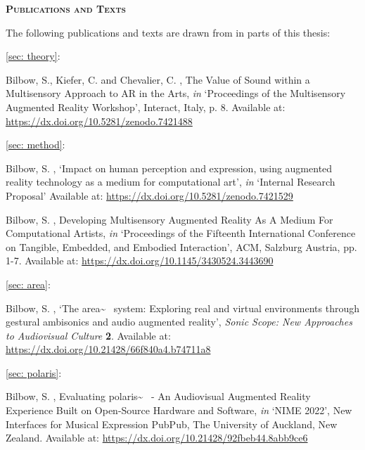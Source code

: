 \newpage
{}
{}
\begin{flushleft}
	\Huge \textsc{\textbf{Publications and Texts}}

\end{flushleft}
\noindent The following publications and texts are drawn from in parts of this thesis:

\noindent\autoref{sec: theory}:  \\
\begin{hangparas}{.25in}{1}
	Bilbow, S., Kiefer, C. and Chevalier, C. \citeyearpar{bilbow2021}, The Value of Sound within a Multisensory Approach to AR in the Arts, \textit{in} `Proceedings of the Multisensory Augmented Reality Workshop', Interact, Italy, p. 8. Available at: \url{https://dx.doi.org/10.5281/zenodo.7421488}
\end{hangparas}

\vspace*{0.75cm}
\noindent\autoref{sec: method}:  \\
\begin{hangparas}{.25in}{1}
	Bilbow, S. \citeyearpar{bilbow2020}, `Impact on human perception and expression, using augmented reality technology as a medium for computational art', \textit{in} `Internal Research Proposal' Available at: \url{https://dx.doi.org/10.5281/zenodo.7421529}
\end{hangparas}

\begin{hangparas}{.25in}{1}
	Bilbow, S. \citeyearpar{bilbow2021b}, Developing Multisensory Augmented Reality As A Medium For Computational Artists, \textit{in} `Proceedings of the Fifteenth International Conference on Tangible, Embedded, and Embodied Interaction', ACM, Salzburg Austria, pp. 1-7. Available at: \url{https://dx.doi.org/10.1145/3430524.3443690}
\end{hangparas}

\vspace*{0.75cm}
\noindent\autoref{sec: area}:  \\
\begin{hangparas}{.25in}{1}
	Bilbow, S. \citeyearpar{bilbow2021a}, `The area\textasciitilde{}~ system: Exploring real and virtual environments through gestural ambisonics and audio augmented reality', \textit{Sonic Scope: New Approaches to Audiovisual Culture} \textbf{2}. Available at: \url{https://dx.doi.org/10.21428/66f840a4.b74711a8}
\end{hangparas}

\vspace*{0.75cm}
\noindent\autoref{sec: polaris}:  \\
\begin{hangparas}{.25in}{1}
	Bilbow, S. \citeyearpar{bilbow2022}, Evaluating polaris\textasciitilde{}~ - An Audiovisual Augmented Reality Experience Built on Open-Source Hardware and Software, \textit{in} `NIME 2022', New Interfaces for Musical Expression PubPub, The University of Auckland, New Zealand. Available at: \url{https://dx.doi.org/10.21428/92fbeb44.8abb9ce6}
\end{hangparas}